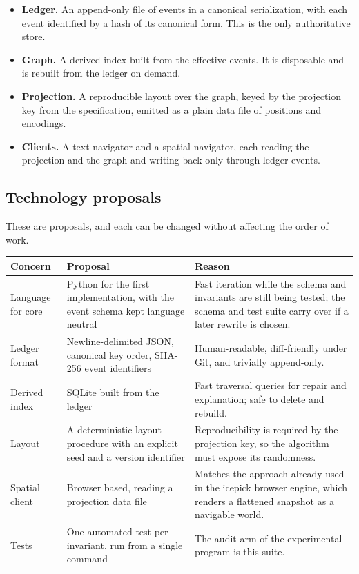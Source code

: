 \documentclass[11pt]{article}
\begin{document}
\begin{itemize}[leftmargin=1.5em]
\item \textbf{Ledger.} An append-only file of events in a canonical serialization, with each event identified by a hash of its canonical form. This is the only authoritative store.
\item \textbf{Graph.} A derived index built from the effective events. It is disposable and is rebuilt from the ledger on demand.
\item \textbf{Projection.} A reproducible layout over the graph, keyed by the projection key from the specification, emitted as a plain data file of positions and encodings.
\item \textbf{Clients.} A text navigator and a spatial navigator, each reading the projection and the graph and writing back only through ledger events.
\end{itemize}

\subsection{Technology proposals}

These are proposals, and each can be changed without affecting the order of work.

\begin{table}[h]
\centering
\small
\begin{tabular}{@{}p{2.8cm}p{4.0cm}p{5.8cm}@{}}
\toprule
Concern & Proposal & Reason\\
\midrule
Language for core & Python for the first implementation, with the event schema kept language neutral & Fast iteration while the schema and invariants are still being tested; the schema and test suite carry over if a later rewrite is chosen.\\
Ledger format & Newline-delimited JSON, canonical key order, SHA-256 event identifiers & Human-readable, diff-friendly under Git, and trivially append-only.\\
Derived index & SQLite built from the ledger & Fast traversal queries for repair and explanation; safe to delete and rebuild.\\
Layout & A deterministic layout procedure with an explicit seed and a version identifier & Reproducibility is required by the projection key, so the algorithm must expose its randomness.\\
Spatial client & Browser based, reading a projection data file & Matches the approach already used in the icepick browser engine, which renders a flattened snapshot as a navigable world.\\
Tests & One automated test per invariant, run from a single command & The audit arm of the experimental program is this suite.\\
\bottomrule
\end{tabular}
\end{table}
\end{document}
